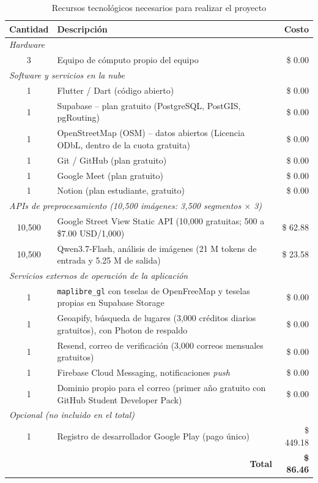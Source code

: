 \begin{table}[htbp]
    \centering
    \caption[Recursos tecnológicos necesarios para realizar el proyecto]{Recursos tecnológicos necesarios para realizar el proyecto}
    \label{tab:recursos_tecnologicos}
    \begin{tabularx}{\textwidth}{|c|X|r|}
        \hline
        \textbf{Cantidad} & \textbf{Descripción} & \textbf{Costo} \\ \hline
        \multicolumn{3}{|l|}{\textit{Hardware}} \\ \hline
        3 & Equipo de cómputo propio del equipo & \$ 0.00 \\ \hline
        \multicolumn{3}{|l|}{\textit{Software y servicios en la nube}} \\ \hline
        1 & Flutter / Dart (código abierto) & \$ 0.00 \\ \hline
        1 & Supabase -- plan gratuito (PostgreSQL, PostGIS, pgRouting) & \$ 0.00 \\ \hline
        1 & OpenStreetMap (OSM) -- datos abiertos (Licencia ODbL, dentro de la cuota gratuita) & \$ 0.00 \\ \hline
        1 & Git / GitHub (plan gratuito) & \$ 0.00 \\ \hline
        1 & Google Meet (plan gratuito) & \$ 0.00 \\ \hline
        1 & Notion (plan estudiante, gratuito) & \$ 0.00 \\ \hline
        \multicolumn{3}{|l|}{\textit{APIs de preprocesamiento (10{,}500 imágenes: 3{,}500 segmentos $\times$ 3)}} \\ \hline
        10{,}500 & Google Street View Static API (10{,}000 gratuitas; 500 a \$7.00 USD/1{,}000) & \$ 62.88 \\ \hline
        10{,}500 & Qwen3.7-Flash, análisis de imágenes (21 M tokens de entrada y 5.25 M de salida) & \$ 23.58 \\ \hline
        \multicolumn{3}{|l|}{\textit{Servicios externos de operación de la aplicación}} \\ \hline
        1 & \texttt{maplibre\_gl} con teselas de OpenFreeMap y teselas propias en Supabase Storage & \$ 0.00 \\ \hline
        1 & Geoapify, búsqueda de lugares (3{,}000 créditos diarios gratuitos), con Photon de respaldo & \$ 0.00 \\ \hline
        1 & Resend, correo de verificación (3{,}000 correos mensuales gratuitos) & \$ 0.00 \\ \hline
        1 & Firebase Cloud Messaging, notificaciones \textit{push} & \$ 0.00 \\ \hline
        1 & Dominio propio para el correo (primer año gratuito con GitHub Student Developer Pack) & \$ 0.00 \\ \hline
        \multicolumn{3}{|l|}{\textit{Opcional (no incluido en el total)}} \\ \hline
        1 & Registro de desarrollador Google Play (pago único) & \$ 449.18 \\ \hline
        \multicolumn{2}{|r|}{\textbf{Total}} & \textbf{\$ 86.46} \\ \hline
    \end{tabularx}
\end{table}

